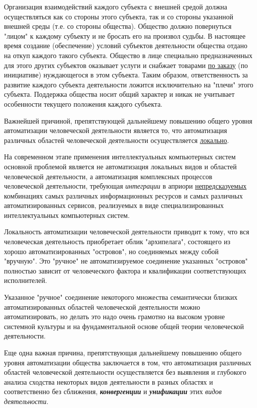 Организация взаимодействий каждого субъекта с внешней средой должна осуществляться как со стороны этого субъекта, так и со стороны указанной внешней среды (т.е. со стороны общества). Общество должно повернуться "лицом"{} к каждому субъекту и не бросать его на произвол судьбы. В настоящее время создание (обеспечение) условий субъектов деятельности общества отдано на откуп каждого такого субъекта. Общество в лице специально предназначенных для этого других субъектов оказывает услуги и снабжает товарами \underline{по заказу} (по инициативе) нуждающегося в этом субъекта. Таким образом, ответственность за развитие каждого субъекта деятельности ложится исключительно на "плечи"{} этого субъекта. Поддержка общества носит общий характер и никак не учитывает особенности текущего положения каждого субъекта.

Важнейшей причиной, препятствующей дальнейшему повышению общего уровня автоматизации человеческой деятельности является то, что автоматизация различных областей человеческой деятельности осуществляется \underline{локально}.

На современном этапе применения интеллектуальных компьютерных систем основной проблемой является не автоматизация локальных видов и областей человеческой деятельности, а автоматизация комплексных процессов человеческой деятельности, требующая \textit{интеграции} в априори \underline{непредсказуемых} комбинациях самых различных информационных ресурсов и самых различных автоматизированных сервисов, реализуемых в виде специализированных интеллектуальных компьютерных систем.

Локальность автоматизации человеческой деятельности приводит к тому, что вся человеческая деятельность приобретает облик "архипелага"{}, состоящего из хорошо автоматизированных "островов"{}, но соединяемых между собой "вручную"{}. Это "ручное"{} не автоматизируемое соединение указанных "островов"{} полностью зависит от человеческого фактора и квалификации соответствующих исполнителей.

Указанное "ручное"{} соединение некоторого множества семантически близких автоматизированных областей человеческой деятельности можно автоматизировать, но делать это надо очень грамотно на высоком уровне системной культуры и на фундаментальной основе общей теории человеческой деятельности.

Еще одна важная причина, препятствующая дальнейшему повышению общего уровня автоматизации общества заключается в том, что автоматизация различных областей человеческой деятельности осуществляется без выявления и глубокого анализа сходства некоторых видов деятельности в разных областях и соответственно без сближения, \textbf{\textit{конвергенции}} и \textbf{\textit{унификации}} этих \textit{видов деятельности}.

